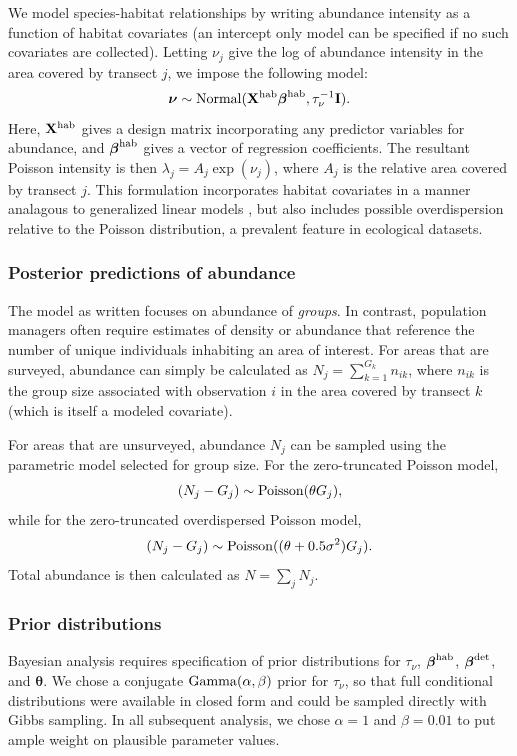 \documentclass[10pt]{article}
\begin{document}
We model species-habitat relationships by writing abundance intensity as a function of habitat covariates (an intercept only model can be specified if no such covariates are collected).  Letting $\nu_j$ give the log of abundance intensity in the area covered by transect $j$, we impose the following model:
$$
 \boldsymbol{\nu} \sim {\rm Normal}({\bf X}^{\rm hab}
 \boldsymbol{\beta}^{\rm hab},\tau_\nu^{-1}{\bf I}).
$$
Here, ${\bf X}^{\rm hab}$ gives a design matrix incorporating any predictor variables for abundance, and $\boldsymbol{\beta}^{\rm hab}$ gives a vector of regression coefficients.
The resultant Poisson intensity is then $\lambda_j=A_j \exp(\nu_j)$, where $A_j$ is the relative area covered by transect $j$.  This formulation incorporates habitat covariates in a manner analagous to generalized linear models \cite{McCullaghNelder1989}, but also includes possible overdispersion relative to the Poisson distribution, a prevalent feature in ecological datasets.

\subsubsection*{Posterior predictions of abundance}

The model as written focuses on abundance of \emph{groups}.  In contrast, population managers often require estimates of density or abundance that reference the number of unique individuals inhabiting an area of interest.  For areas that are surveyed, abundance can simply be calculated as $N_j=\sum_{k=1}^{G_k} n_{ik}$, where $n_{ik}$ is the group size associated with observation $i$ in the area covered by transect $k$ (which is itself a modeled covariate).

For areas that are unsurveyed, abundance $N_j$ can be sampled using the parametric model selected for group size.  For the zero-truncated Poisson model,
$$(N_j-G_j) \sim {\rm Poisson}(\theta G_j),
$$
while for the zero-truncated overdispersed Poisson model,
$$(N_j-G_j) \sim {\rm Poisson}((\theta+0.5\sigma^2) G_j).$$
Total abundance is then calculated as $N=\sum_j N_j$.

\subsubsection*{Prior distributions}

Bayesian analysis requires specification of prior distributions for $\tau_\nu$, $\boldsymbol{\beta}^{\rm hab}$, $\boldsymbol{\beta}^{\rm det}$, and $\boldsymbol{\theta}$.  We chose a conjugate ${\rm Gamma}(\alpha,\beta)$ prior for $\tau_\nu$, so that full conditional distributions were available in closed form and could be sampled directly with Gibbs sampling. In all subsequent analysis, we chose $\alpha=1$ and $\beta=0.01$ to put ample weight on plausible parameter values.
\end{document}
